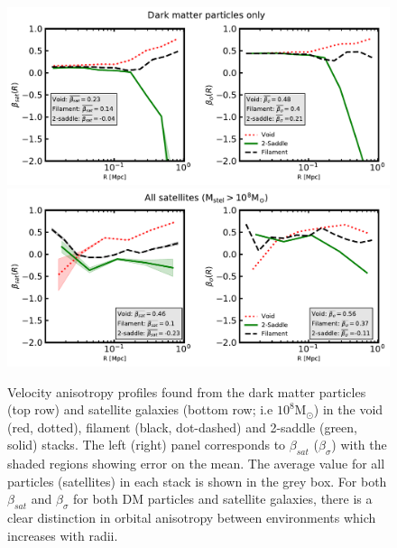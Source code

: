 \begin{figure}
	\includegraphics[width=\linewidth]{thesis/latex/dyn_mod_files/disperse_beta_dm_particles.pdf} \\
	\includegraphics[width=\linewidth]{thesis/latex/dyn_mod_files/disperse_beta_paper_local.pdf} 
    \caption{Velocity anisotropy profiles found from the dark matter particles (top row) and satellite galaxies (bottom row; i.e $\mathrm{10^{8}M_{\odot}}$) in the void (red, dotted), filament (black, dot-dashed) and 2-saddle (green, solid) stacks. The left (right) panel corresponds to $\beta_{sat}$ ($\beta_{\sigma}$) with the shaded regions showing error on the mean. The average value for all particles (satellites) in each stack is shown in the grey box. For both $\beta_{sat}$ and $\beta_{\sigma}$ for both DM particles and satellite galaxies, there is a clear distinction in orbital anisotropy between environments which increases with radii.}
    \label{fig:beta_stack}
\end{figure}

